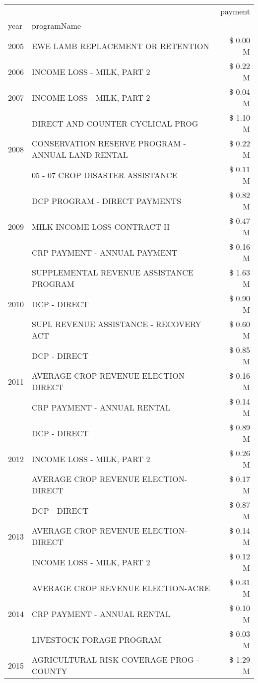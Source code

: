 \begin{tabular}{llr}
\toprule
 &  & payment \\
year & programName &  \\
\midrule
2005 & EWE LAMB REPLACEMENT OR RETENTION & \$ 0.00 M \\
\cline{1-3}
2006 & INCOME LOSS - MILK, PART 2 & \$ 0.22 M \\
\cline{1-3}
2007 & INCOME LOSS - MILK, PART 2 & \$ 0.04 M \\
\cline{1-3}
\multirow[t]{3}{*}{2008} & DIRECT AND COUNTER CYCLICAL PROG & \$ 1.10 M \\
 & CONSERVATION RESERVE PROGRAM - ANNUAL LAND RENTAL & \$ 0.22 M \\
 & 05 - 07 CROP DISASTER ASSISTANCE & \$ 0.11 M \\
\cline{1-3}
\multirow[t]{3}{*}{2009} & DCP PROGRAM - DIRECT PAYMENTS & \$ 0.82 M \\
 & MILK INCOME LOSS CONTRACT II & \$ 0.47 M \\
 & CRP PAYMENT - ANNUAL PAYMENT & \$ 0.16 M \\
\cline{1-3}
\multirow[t]{3}{*}{2010} & SUPPLEMENTAL REVENUE ASSISTANCE PROGRAM & \$ 1.63 M \\
 & DCP - DIRECT & \$ 0.90 M \\
 & SUPL REVENUE ASSISTANCE - RECOVERY ACT & \$ 0.60 M \\
\cline{1-3}
\multirow[t]{3}{*}{2011} & DCP - DIRECT & \$ 0.85 M \\
 & AVERAGE CROP REVENUE ELECTION-DIRECT & \$ 0.16 M \\
 & CRP PAYMENT - ANNUAL RENTAL & \$ 0.14 M \\
\cline{1-3}
\multirow[t]{3}{*}{2012} & DCP - DIRECT & \$ 0.89 M \\
 & INCOME LOSS - MILK, PART 2 & \$ 0.26 M \\
 & AVERAGE CROP REVENUE ELECTION-DIRECT & \$ 0.17 M \\
\cline{1-3}
\multirow[t]{3}{*}{2013} & DCP - DIRECT & \$ 0.87 M \\
 & AVERAGE CROP REVENUE ELECTION-DIRECT & \$ 0.14 M \\
 & INCOME LOSS - MILK, PART 2 & \$ 0.12 M \\
\cline{1-3}
\multirow[t]{3}{*}{2014} & AVERAGE CROP REVENUE ELECTION-ACRE & \$ 0.31 M \\
 & CRP PAYMENT - ANNUAL RENTAL & \$ 0.10 M \\
 & LIVESTOCK FORAGE PROGRAM & \$ 0.03 M \\
\cline{1-3}
\multirow[t]{3}{*}{2015} & AGRICULTURAL RISK COVERAGE PROG - COUNTY & \$ 1.29 M \\

\end{tabular}
